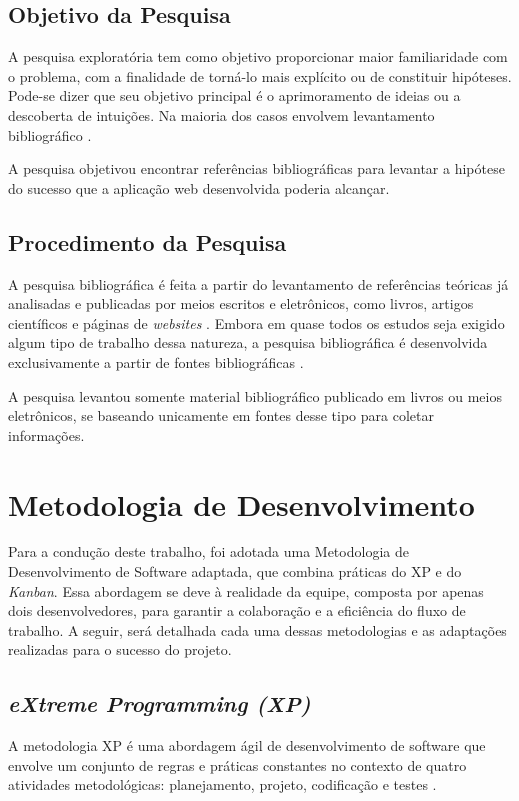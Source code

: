 \subsection[Objetivo da Pesquisa]{Objetivo da Pesquisa}

A pesquisa exploratória tem como objetivo proporcionar maior familiaridade com o problema, com a finalidade de torná-lo mais explícito ou de constituir hipóteses. Pode-se dizer que seu objetivo principal é o aprimoramento de ideias ou a descoberta de intuições. Na maioria dos casos envolvem levantamento bibliográfico \cite{gil2002elaborar}.

A pesquisa objetivou encontrar referências bibliográficas para levantar a hipótese do sucesso que a aplicação web desenvolvida poderia alcançar.

\subsection[Procedimento da Pesquisa]{Procedimento da Pesquisa}

A pesquisa bibliográfica é feita a partir do levantamento de referências teóricas já analisadas e publicadas por meios escritos e eletrônicos, como livros, artigos científicos e páginas de \textit{websites} \cite{gerhardt2009metodos}. Embora em quase todos os estudos seja exigido algum tipo de trabalho dessa natureza, a pesquisa bibliográfica é desenvolvida exclusivamente a partir de fontes bibliográficas \cite{gil2002elaborar}.

A pesquisa levantou somente material bibliográfico publicado em livros ou meios eletrônicos, se baseando unicamente em fontes desse tipo para coletar informações.

\section[Metodologia de Desenvolvimento]{Metodologia de Desenvolvimento}
\label{metodologia-desenvolvimento}

Para a condução deste trabalho, foi adotada uma Metodologia de Desenvolvimento de Software adaptada, que combina práticas do XP e do \textit{Kanban}. Essa abordagem se deve à realidade da equipe, composta por apenas dois desenvolvedores, para garantir a colaboração e a eficiência do fluxo de trabalho. A seguir, será detalhada cada uma dessas metodologias e as adaptações realizadas para o sucesso do projeto.

\subsection[\textit{eXtreme Programming (XP)}]{\textit{eXtreme Programming (XP)}}
A metodologia XP é uma abordagem ágil de desenvolvimento de software que envolve um conjunto de regras e práticas constantes no contexto de quatro atividades metodológicas: planejamento, projeto, codificação e testes \cite{pressman2021engenharia}.

